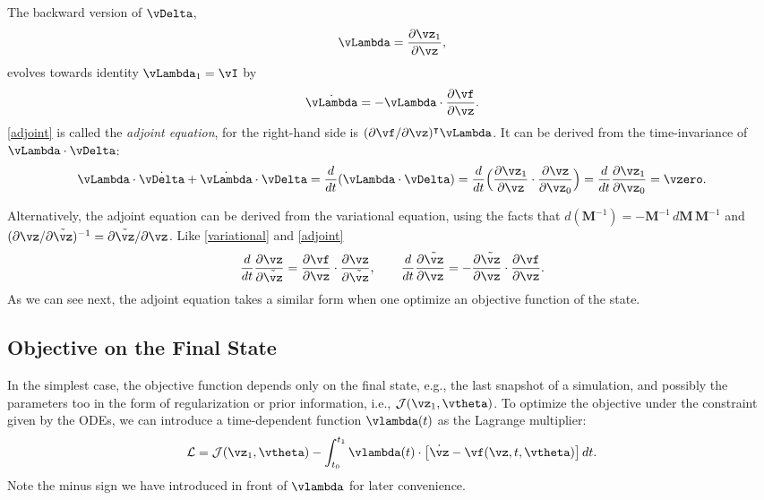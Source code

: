 \documentclass[modern, trackchanges, dvipsnames]{aastex631}
\renewcommand{\d}{d}
\newcommand{\p}{\partial}
\newcommand{\cJ}{\mathcal{J}}
\newcommand{\cL}{\mathcal{L}}
\begin{document}
The backward version of $\vDelta$,
%
\begin{equation}
\vLambda = \frac{\p\vz_1}{\p\vz},
\end{equation}
%
evolves towards identity $\vLambda_1 = \vI$ by
%
\begin{equation}
\dot\vLambda = - \vLambda \cdot \frac{\p\vf}{\p\vz}.
\label{adjoint}
\end{equation}
%
\eqref{adjoint} is called the \emph{adjoint equation}, for the
right-hand side is $(\p\vf / \p\vz)^\intercal \vLambda$.
It can be derived from the time-invariance of $\vLambda \cdot \vDelta$:
%
\begin{equation}
\vLambda \cdot \dot\vDelta + \dot\vLambda \cdot \vDelta
= \frac\d{\d t} (\vLambda \cdot \vDelta)
= \frac\d{\d t} \Bigl( \frac{\p\vz_1}{\p\vz}
  \cdot \frac{\p\vz}{\p\vz_0} \Bigr)
= \frac\d{\d t} \frac{\p\vz_1}{\p\vz_0}
= \vzero.
\end{equation}

Alternatively, the adjoint equation can be derived from the variational
equation, using the facts that $\d (\bm{M}^{-1}) = - \bm{M}^{-1} \, \d
\bm{M} \, \bm{M}^{-1}$ and $(\p\vz / \p\tilde\vz)^{-1} = \p\tilde\vz /
\p\vz$.
Like \eqref{variational} and \eqref{adjoint}
%
\begin{equation}
\frac\d{\d t} \frac{\p\vz}{\p\tilde\vz}
= \frac{\p\vf}{\p\vz} \cdot \frac{\p\vz}{\p\tilde\vz},
\qquad
\frac\d{\d t} \frac{\p\tilde\vz}{\p\vz}
= - \frac{\p\tilde\vz}{\p\vz} \cdot \frac{\p\vf}{\p\vz}.
\end{equation}
As we can see next, the adjoint equation takes a similar form when one
optimize an objective function of the state.


\vspace{1em}
\subsection{Objective on the Final State}

In the simplest case, the objective function depends only on the final
state, e.g., the last snapshot of a simulation, and possibly the
parameters too in the form of regularization or prior information, i.e.,
$\cJ(\vz_1, \vtheta)$.
To optimize the objective under the constraint given by the ODEs, we can
introduce a time-dependent function $\vlambda(t)$ as the Lagrange
multiplier:
%
\begin{equation}
\cL = \cJ(\vz_1, \vtheta)
- \int_{t_0}^{t_1} \vlambda(t)
  \cdot \bigl[ \dot\vz - \vf(\vz, t, \vtheta) \bigr] \, \d t.
\end{equation}
%
Note the minus sign we have introduced in front of $\vlambda$ for later
convenience.
\end{document}
